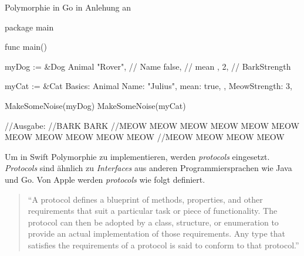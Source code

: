 \begin{listing}[H]
\caption{Polymorphie in Go in Anlehung an \cite[]{WilliamKennedy.2013}}
\label{lst:PolymorhpieGo}
\begin{GoCode}
package main

func main() {
    myDog := &Dog{
        Animal{
            "Rover", // Name
            false,   // mean
        },
        2, // BarkStrength
    }

    myCat := &Cat{
        Basics: Animal{
            Name: "Julius",
            mean: true,
        },
        MeowStrength: 3,
    }

    MakeSomeNoise(myDog)
    MakeSomeNoise(myCat)
}
//Ausgabe:
//BARK BARK
//MEOW MEOW MEOW MEOW MEOW MEOW MEOW MEOW MEOW MEOW MEOW 
//MEOW MEOW MEOW MEOW
\end{GoCode}
\end{listing}

Um in Swift Polymorphie zu implementieren, werden \textit{protocols} eingesetzt.
\textit{Protocols} sind ähnlich zu \textit{Interfaces} aus anderen Programmiersprachen wie Java und Go.
Von Apple werden \textit{protocols} wie folgt definiert.

\begin{quote}
\enquote{A protocol defines a blueprint of methods, properties, and other requirements that suit a particular
task or piece of functionality. The protocol can then be adopted by a class, structure, or enumeration
to provide an actual implementation of those requirements. Any type that satisfies the requirements of
a protocol is said to conform to that protocol.} \cite[S.341]{Apple.2017}
\end{quote}



